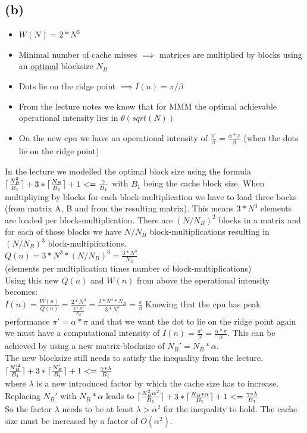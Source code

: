 \documentclass[10pt,a4paper,oneside,notitlepage]{report}
\DeclarePairedDelimiter{\ceil}{\lceil}{\rceil}
\begin{document}
\subsection*{(b)}
\begin{itemize}
\item $W(N) = 2*N^3$
\item Minimal number of cache misses $\implies$ matrices are multiplied by blocks using an \underline{optimal} blocksize $N_B$ 
\item Dots lie on the ridge point $\implies I(n) = \pi/\beta$ 
\item From the lecture notes we know that for MMM the optimal achievable operational intensity lies in $\theta(sqrt(N))$
\item On the new cpu we have an operational intensity of $\frac{\pi'}{\beta}=\frac{\alpha*\pi}{\beta}$ (when the dots lie on the ridge point)
\end{itemize}
In the lecture we modelled the optimal block size using the formula $\ceil{\frac{N_B^2}{B_1}} + 3*\ceil{\frac{N_B}{B_1}} + 1 <= \frac{\gamma}{B_1}$ with $B_1$ being the cache block size. When multipliying by blocks for each block-multiplication we have to load three bocks (from matrix A, B and from the resulting matrix). This means $3*N^3$ elements are loaded per block-multiplication. There are $(N/N_B)^2$ blocks in a matrix and for each of those blocks we have $N/N_B$ block-multiplications resulting in $(N/N_B)^3$ block-multiplications.\\
$Q(n)={3*N^3 * (N/N_B)^3}=\frac{3*N^3}{N_B}$ \\ (elements per multiplication times number of block-multiplications) \\
Using this new $Q(n)$ and $W(n)$ from above the operational intensity becomes: \\ $I(n)=\frac{W(n)}{Q(n)}=\frac{2*N^3}{\frac{3*N^3}{N_B}} = \frac{2*N^3*N_B}{3*N^3} =\frac{\pi}{\beta}$
Knowing that the cpu has peak performance $\pi'=\alpha*\pi$ and that we want the dot to lie on the ridge point again we must have a computational intensity of $I(n)=\frac{\pi'}{\beta} = \frac{\alpha*\pi}{\beta}$. This can be achieved by using a new matrix-blocksize of $N_B'=N_B*\alpha$. \\
The new blocksize still needs to satisfy the inequality from the lecture. \\
$\ceil{\frac{N_B'^2}{B_1}} + 3*\ceil{\frac{N_B'}{B_1}} + 1 <= \frac{\gamma*\lambda}{B_1}$ \\
where $\lambda$ is a new introduced factor by which the cache size has to increase. \\
Replacing $N_B'$ with $N_B*\alpha$ leads to
$\ceil{\frac{N_B^2\alpha^2}{B_1}} + 3*\ceil{\frac{N_B*\alpha}{B_1}} + 1 <= \frac{\gamma*\lambda}{B_1}$ \\
So the factor $\lambda$ needs to be at least $\lambda>\alpha^2$ for the inequality to hold. The cache size must be increased by a factor of $O(\alpha^2)$.
\end{document}
